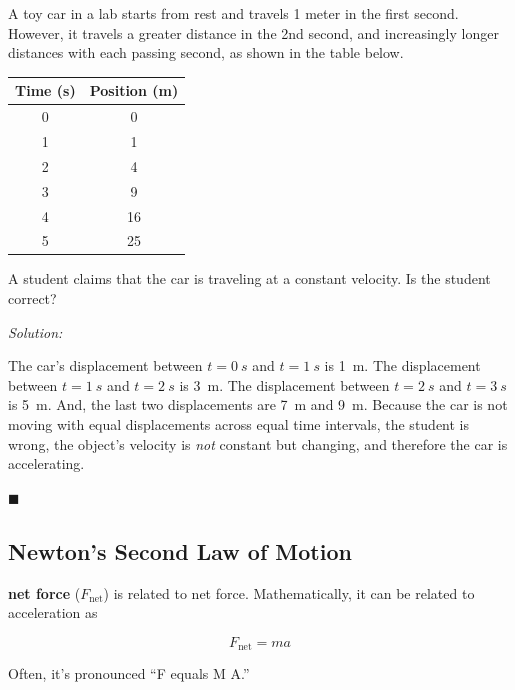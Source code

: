 \documentclass[dvipsnames]{article}
\begin{document}
\begin{example}
A toy car in a lab starts from rest and travels 1 meter in the first second. However, it travels a greater distance in the 2nd second, and increasingly longer distances with each passing second, as shown in the table below.

\begin{center}
    \begin{tabular}{|c|c|}
        \hline
         \textbf{Time} (s) & \textbf{Position} (m) \\ \hline
         0 & 0 \\ \hline
         1 & 1 \\ \hline
         2 & 4 \\ \hline
         3 & 9 \\ \hline
         4 & 16 \\ \hline
         5 & 25 \\ \hline
    \end{tabular}
\end{center}

A student claims that the car is traveling at a constant velocity. Is the student correct?
\end{example}

\textit{Solution:}

The car's displacement between $t = \SI{0}{s}$ and $t = \SI{1}{s}$ is \SI{1}{m}. The displacement between $t = \SI{1}{s}$ and $t = \SI{2}{s}$ is \SI{3}{m}. The displacement between $t = \SI{2}{s}$ and $t = \SI{3}{s}$ is \SI{5}{m}. And, the last two displacements are \SI{7}{m} and \SI{9}{m}. Because the car is not moving with equal displacements across equal time intervals, the student is wrong, the object's velocity is \textit{not} constant but changing, and therefore the car is accelerating.

\hfill $\blacksquare$


\subsection{Newton's Second Law of Motion}

\textbf{\Gls{net force}} ($F_\text{net}$) is related to \glsdesc{net force}. Mathematically, it can be related to acceleration as

\begin{equation*}
    F_\text{net} = ma
\end{equation*}

Often, it's pronounced ``F equals M A.''
\end{document}
